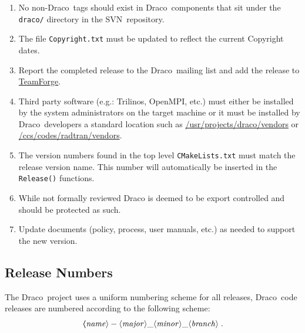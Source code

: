 \documentclass[note]{ResearchNote_pdf}
\newcommand{\draco}{{\normalfont\small\sffamily Draco}}
\newcommand{\cvs}{\textsf{CVS}}
\newcommand{\svn}{\textsf{SVN}}
\begin{document}
\begin{enumerate}

\item No non-\draco\ tags should exist in \draco\ components that sit
  under the \texttt{draco/} directory in the \svn\ repository. 

\item The file \texttt{Copyright.txt} must be updated to reflect the
  current Copyright dates.

\item Report the completed release to the \draco\ mailing list and add
  the release to
  \href{https://tf.lanl.gov/sf/frs/do/viewSummary/projects.draco/frs}{TeamForge}. 

\item Third party software (e.g.: Trilinos, OpenMPI, etc.) must either
  be installed by the system administrators on the target machine or
  it must be installed by \draco\ developers a standard location such as
  \url{/usr/projects/draco/vendors} or
  \url{/ccs/codes/radtran/vendors}. 

\item The version numbers found in the top level
  \texttt{CMakeLists.txt} must match the release version name.  This
  number will automatically be inserted in the \texttt{Release()}
  functions.

\item While not formally reviewed Draco is deemed to be export
  controlled and should be protected as such.

\item Update documents (policy, process, user manuals, etc.) as needed
  to support the new version.
\end{enumerate}


\subsection{Release Numbers}
\label{sec:rel_num}

The \draco\ project uses a uniform numbering scheme for all releases,
\draco\ code releases are numbered according to the following scheme:
\begin{equation}
  \boldsymbol
  \langle\mathit{name}\rangle-
  \langle\mathit{major}\rangle\_
  \langle\mathit{minor}\rangle\_
  \langle\mathit{branch}\rangle\; .
  \notag
\end{equation}
\end{document}
